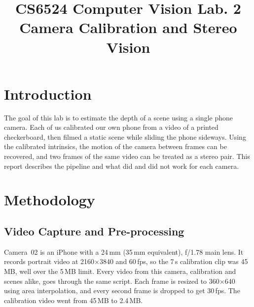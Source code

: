 \documentclass[conference]{assets/latex/IEEEtran}
\begin{document}
\title{CS6524 Computer Vision Lab. 2\\ Camera Calibration and Stereo Vision}

\author{
\and
{}
\and
{}
}

\maketitle

\section{Introduction}
The goal of this lab is to estimate the depth of a scene using a single phone camera. Each of us calibrated our own phone from a video of a printed checkerboard, then filmed a static scene while sliding the phone sideways. Using the calibrated intrinsics, the motion of the camera between frames can be recovered, and two frames of the same video can be treated as a stereo pair. This report describes the pipeline and what did and did not work for each camera.

\section{Methodology}

\subsection{Video Capture and Pre-processing}
Camera~02 is an iPhone with a 24\,mm (35\,mm equivalent), f/1.78 main lens. It records portrait video at 2160$\times$3840 and 60\,fps, so the 7\,s calibration clip was 45\,MB, well over the 5\,MB limit. Every video from this camera, calibration and scenes alike, goes through the same script. Each frame is resized to 360$\times$640 using area interpolation, and every second frame is dropped to get 30\,fps. The calibration video went from 45\,MB to 2.4\,MB.
\end{document}
